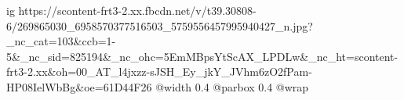  
 
 
 
 

\ifcmt
  ig https://scontent-frt3-2.xx.fbcdn.net/v/t39.30808-6/269865030_6958570377516503_5759556457995940427_n.jpg?_nc_cat=103&ccb=1-5&_nc_sid=825194&_nc_ohc=5EmMBpsYtScAX_LPDLw&_nc_ht=scontent-frt3-2.xx&oh=00_AT_l4jxzz-sJSH_Ey_jkY_JVhm6zO2fPam-HP08IelWbBg&oe=61D44F26
  @width 0.4
  @parbox 0.4
  @wrap \parpic[r]
\fi
